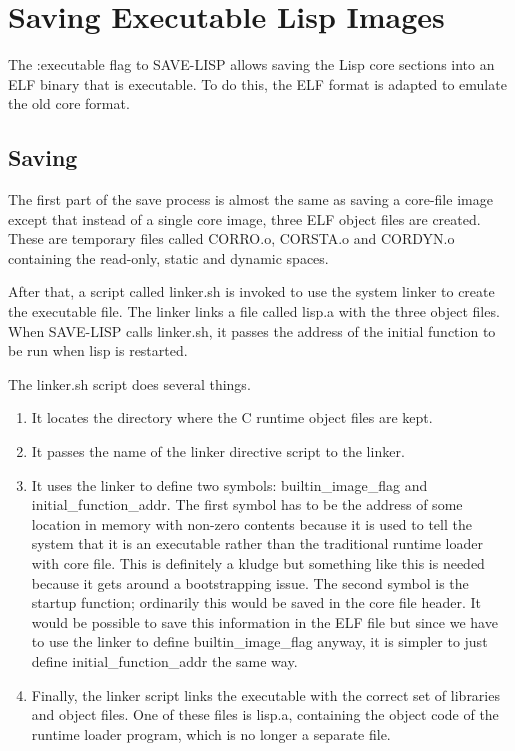 \chapter{Saving Executable Lisp Images}

The :executable flag to SAVE-LISP allows saving the Lisp core sections into an ELF binary that
is executable.  To do this, the ELF format is adapted to emulate the old core format.

\section{Saving}
The first part of the save process is almost the same as saving a core-file image except that
instead of a single core image, three ELF object files are created.  These are temporary files
called CORRO.o, CORSTA.o and CORDYN.o containing the read-only, static and dynamic spaces.

After that, a script called linker.sh is invoked to use the system linker to create the
executable file.  The linker links a file called lisp.a with the three object files.  When
SAVE-LISP calls linker.sh, it passes the address of the initial function to be run when lisp is
restarted.

The linker.sh script does several things.

\begin{enumerate}
\item It locates the directory where the C runtime object files are kept.
\item It passes the name of the linker directive script to the linker.
\item It uses the linker to define two symbols: builtin_image_flag and initial_function_addr.
  The first symbol has to be the address of some location in memory with non-zero contents
  because it is used to tell the system that it is an executable rather than the traditional
  runtime loader with core file.  This is definitely a kludge but something like this is needed
  because it gets around a bootstrapping issue.  The second symbol is the startup function;
  ordinarily this would be saved in the core file header.  It would be possible to save this
  information in the ELF file but since we have to use the linker to define builtin_image_flag
  anyway, it is simpler to just define initial_function_addr the same way.
\item Finally, the linker script links the executable with the correct set of libraries and
  object files.  One of these files is lisp.a, containing the object code of the runtime
  loader program, which is no longer a separate file.
\end{enumerate}

